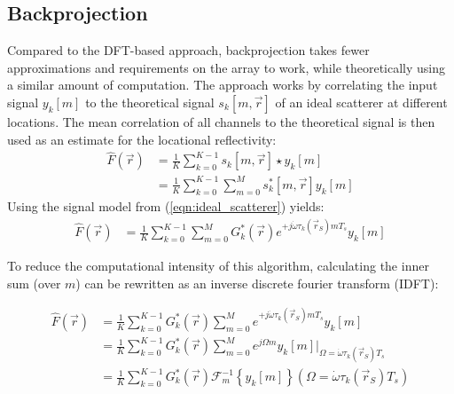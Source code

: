 \subsection{Backprojection}
\label{ssec:bp_imaging_theory}
Compared to the DFT-based approach, backprojection takes fewer approximations and requirements on the array to work,
while theoretically using a similar amount of computation.
The approach works by correlating the input signal $y_k[m]$
to the theoretical signal $s_k[m, \vec r]$ of an ideal scatterer at different locations.
The mean correlation of all channels to the theoretical signal is then used as an estimate for the locational reflectivity:
\begin{align}
    \hat F(\vec r) & = \frac{1}{K} \sum_{k=0}^{K-1} s_k[m, \vec r] \star y_k[m]             \\
                   & = \frac{1}{K}\sum_{k=0}^{K-1}\sum_{m=0}^{M} s_k^\ast[m, \vec r] y_k[m]
\end{align}
Using the signal model from (\ref*{eqn:ideal_scatterer}) yields:
\begin{align}
    \hat F(\vec r) & = \frac{1}{K}\sum_{k=0}^{K-1}\sum_{m=0}^{M}
    G_k^\ast(\vec r)e^{+j\dot\omega\tau_k(\vec r_S)mT_s} y_k[m]
\end{align}

To reduce the computational intensity of this algorithm,
calculating the inner sum (over $m$) can be rewritten as an inverse discrete fourier transform (IDFT):

\begin{align}
    \hat F(\vec r) & = \frac{1}{K}\sum_{k=0}^{K-1}G_k^\ast(\vec r)
    \sum_{m=0}^{M} e^{+j\dot\omega\tau_k(\vec r_S)mT_s} y_k[m]     \\
                   & = \frac{1}{K}\sum_{k=0}^{K-1}G_k^\ast(\vec r)
    \sum_{m=0}^{M} e^{j\Omega m} y_k[m]
    \Big|_{\Omega=\dot\omega\tau_k(\vec r_S)T_s}                   \\
                   & = \frac{1}{K}\sum_{k=0}^{K-1}G_k^\ast(\vec r)
    \mathcal{F}_m^{-1} \left\{ y_k[m]\right\}(\Omega=\dot\omega\tau_k(\vec r_S)T_s)
\end{align}

